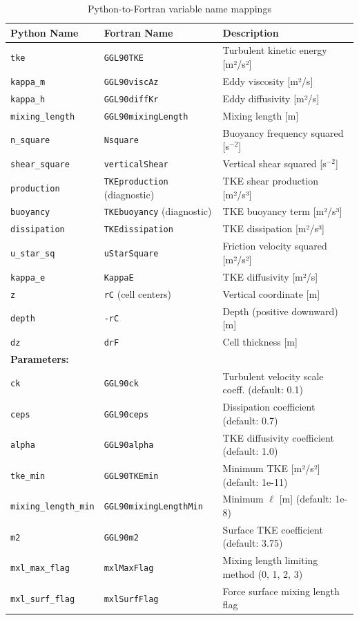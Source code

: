 \documentclass[11pt]{article}
\begin{document}
\begin{table}[h]
\centering
\small
\begin{tabular}{llp{5cm}}
\toprule
\textbf{Python Name} & \textbf{Fortran Name} & \textbf{Description} \\
\midrule
\verb|tke| & \verb|GGL90TKE| & Turbulent kinetic energy [m²/s²] \\
\verb|kappa_m| & \verb|GGL90viscAz| & Eddy viscosity [m²/s] \\
\verb|kappa_h| & \verb|GGL90diffKr| & Eddy diffusivity [m²/s] \\
\verb|mixing_length| & \verb|GGL90mixingLength| & Mixing length [m] \\
\verb|n_square| & \verb|Nsquare| & Buoyancy frequency squared [s$^{-2}$] \\
\verb|shear_square| & \verb|verticalShear| & Vertical shear squared [s$^{-2}$] \\
\verb|production| & \verb|TKEproduction| (diagnostic) & TKE shear production [m²/s³] \\
\verb|buoyancy| & \verb|TKEbuoyancy| (diagnostic) & TKE buoyancy term [m²/s³] \\
\verb|dissipation| & \verb|TKEdissipation| & TKE dissipation [m²/s³] \\
\verb|u_star_sq| & \verb|uStarSquare| & Friction velocity squared [m²/s²] \\
\verb|kappa_e| & \verb|KappaE| & TKE diffusivity [m²/s] \\
\verb|z| & \verb|rC| (cell centers) & Vertical coordinate [m] \\
\verb|depth| & \verb|-rC| & Depth (positive downward) [m] \\
\verb|dz| & \verb|drF| & Cell thickness [m] \\
\midrule
\multicolumn{3}{l}{\textbf{Parameters:}} \\
\verb|ck| & \verb|GGL90ck| & Turbulent velocity scale coeff. (default: 0.1) \\
\verb|ceps| & \verb|GGL90ceps| & Dissipation coefficient (default: 0.7) \\
\verb|alpha| & \verb|GGL90alpha| & TKE diffusivity coefficient (default: 1.0) \\
\verb|tke_min| & \verb|GGL90TKEmin| & Minimum TKE [m²/s²] (default: 1e-11) \\
\verb|mixing_length_min| & \verb|GGL90mixingLengthMin| & Minimum $\ell$ [m] (default: 1e-8) \\
\verb|m2| & \verb|GGL90m2| & Surface TKE coefficient (default: 3.75) \\
\verb|mxl_max_flag| & \verb|mxlMaxFlag| & Mixing length limiting method (0, 1, 2, 3) \\
\verb|mxl_surf_flag| & \verb|mxlSurfFlag| & Force surface mixing length flag \\
\bottomrule
\end{tabular}
\caption{Python-to-Fortran variable name mappings}
\end{table}
\end{document}
